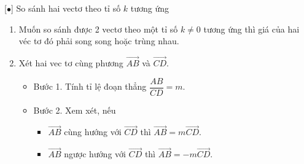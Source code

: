 [$\bullet$] So sánh hai vectơ theo tỉ số $k$ tương ứng
\begin{enumerate}[\faPencilSquareO]
	\item Muốn so sánh được 2 vectơ theo một tỉ số $k \ne 0$ tương ứng thì giá của hai véc tơ đó phải song song hoặc trùng nhau.
	\item Xét hai vec tơ cùng phương $\overrightarrow{AB}$ và $\overrightarrow{CD}$.
	\begin{itemize}
		\item Bước 1. Tính tỉ lệ đoạn thẳng $\dfrac{AB}{CD}=m$.
		\item Bước 2. Xem xét, nếu
		\begin{itemize}
			\item $\overrightarrow{AB}$ cùng hướng với $\overrightarrow{CD}$ thì $\overrightarrow{AB}=m\overrightarrow{CD}$.
			\item $\overrightarrow{AB}$ ngược hướng với $\overrightarrow{CD}$ thì $\overrightarrow{AB}=-m\overrightarrow{CD}$.
		\end{itemize}
	\end{itemize}
\end{enumerate}
